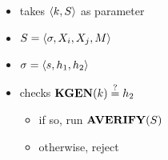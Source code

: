 \begin{frame}
	\frametitle{\verify}

	\begin{itemize}
		\item takes $\langle k, S \rangle$ as parameter
		\item $S=\langle \sigma, X_i, X_j, M \rangle$
		\item $\sigma = \langle s, h_1, h_2 \rangle$
		\item checks $\textbf{KGEN}(k) \overset{?}{=} h_2$
			\begin{itemize}
				\item if so, run $\textbf{AVERIFY}(S)$
				\item otherwise, reject
			\end{itemize}
	\end{itemize}
\end{frame}